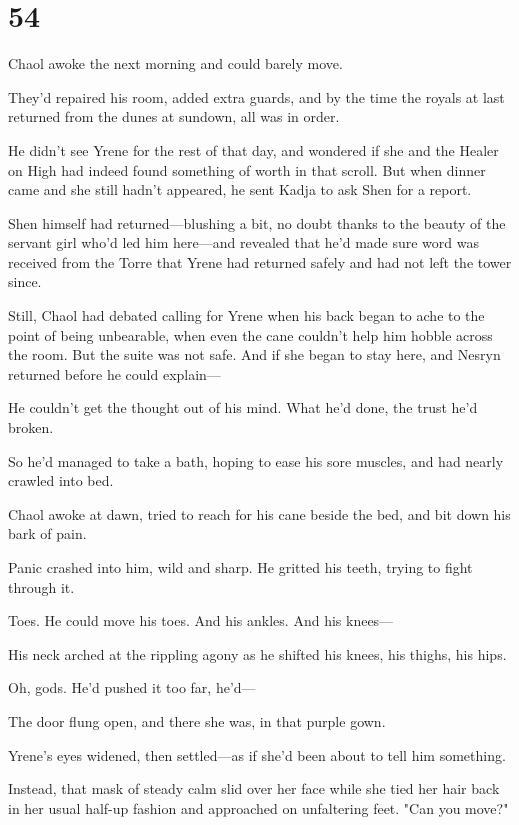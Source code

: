 
\chapter{54}

Chaol awoke the next morning and could barely move.

They'd repaired his room, added extra guards, and by the time the royals at last returned from the dunes at sundown, all was in order.

He didn't see Yrene for the rest of that day, and wondered if she and the Healer on High had indeed found something of worth in that scroll.
But when dinner came and she still hadn't appeared, he sent Kadja to ask Shen for a report.

Shen himself had returned---blushing a bit, no doubt thanks to the beauty of the servant girl who'd led him here---and revealed that he'd made sure word was received from the Torre that Yrene had returned safely and had not left the tower since.

Still, Chaol had debated calling for Yrene when his back began to ache to the point of being unbearable, when even the cane couldn't help him hobble across the room.
But the suite was not safe.
And if she began to stay here, and Nesryn returned before he could explain---

He couldn't get the thought out of his mind.
What he'd done, the trust he'd broken.

So he'd managed to take a bath, hoping to ease his sore muscles, and had nearly crawled into bed.

Chaol awoke at dawn, tried to reach for his cane beside the bed, and bit down his bark of pain.

Panic crashed into him, wild and sharp.
He gritted his teeth, trying to fight through it.

Toes.
He could move his toes.
And his ankles.
And his knees---

His neck arched at the rippling agony as he shifted his knees, his thighs, his hips.

Oh, gods.
He'd pushed it too far, he'd---

The door flung open, and there she was, in that purple gown.

Yrene's eyes widened, then settled---as if she'd been about to tell him something.

Instead, that mask of steady calm slid over her face while she tied her hair back in her usual half-up fashion and approached on unfaltering feet.
"Can you move?"

